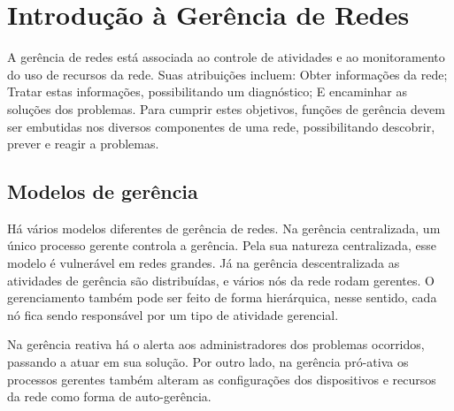 \documentclass[brazil,times,12pt]{abnt}
\begin{document}





\data{\today}

\capa

\folhaderosto

\section*{Introdução à Gerência de Redes}
A gerência de redes está associada ao controle de atividades e ao monitoramento
do uso de recursos da rede. Suas atribuições incluem: Obter informações da
rede; Tratar estas informações, possibilitando um diagnóstico; E encaminhar as
soluções dos problemas. Para cumprir estes objetivos, funções de gerência devem
ser embutidas nos diversos componentes de uma rede, possibilitando descobrir,
prever e reagir a problemas. \cite{duarte:gerencia_redes}

\subsection*{Modelos de gerência}
Há vários modelos diferentes de gerência de redes. Na gerência centralizada, um
único processo gerente controla a gerência. Pela sua natureza centralizada, esse
modelo é vulnerável em redes grandes. Já na gerência descentralizada as
atividades de gerência são distribuídas, e vários nós da rede rodam gerentes. O
gerenciamento também pode ser feito de forma hierárquica, nesse sentido, cada
nó fica sendo responsável por um tipo de atividade gerencial. \cite{wiki:network_management}

Na gerência reativa há o alerta aos administradores dos problemas ocorridos,
passando a atuar em sua solução. Por outro lado, na gerência pró-ativa os
processos gerentes também alteram as configurações dos dispositivos e recursos
da rede como forma de auto-gerência.
\end{document}
